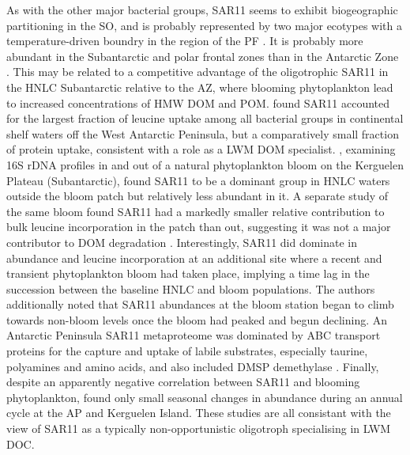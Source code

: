 As with the other major bacterial groups, SAR11 seems to exhibit biogeographic partitioning in the \ac{SO}, and is probably represented by two major ecotypes with a temperature-driven boundry in the region of the \ac{PF} \cite{Brown:2012gna}.
It is probably more abundant in the Subantarctic and polar frontal zones than in the Antarctic Zone \cite{Giebel:2009hr,Ghiglione:2011ee}.
This may be related to a competitive advantage of the oligotrophic SAR11 in the \ac{HNLC} Subantarctic relative to the \ac{AZ}, where blooming phytoplankton lead to increased concentrations of \ac{HMW} \ac{DOM} and \ac{POM}.
\citet{Straza:2010io} found SAR11 accounted for the largest fraction of leucine uptake among all bacterial groups in continental shelf waters off the West Antarctic Peninsula, but a comparatively small fraction of protein uptake, consistent with a role as a \ac{LWM} \ac{DOM} specialist.
\citet{West:2008kc}, examining 16S rDNA profiles in and out of a natural phytoplankton bloom on the Kerguelen Plateau (Subantarctic), found SAR11 to be a dominant group in \ac{HNLC} waters outside the bloom patch but relatively less abundant in it.
A separate study of the same bloom found SAR11 had a markedly smaller relative contribution to bulk leucine incorporation in the patch than out, suggesting it was not a major contributor to \ac{DOM} degradation \cite{Obernosterer:2011df}.
Interestingly, SAR11 did dominate in abundance and leucine incorporation at an additional site where a recent and transient phytoplankton bloom had taken place, implying a time lag in the succession between the baseline \ac{HNLC} and bloom populations.
The authors additionally noted that SAR11 abundances at the bloom station began to climb towards non-bloom levels once the bloom had peaked and begun declining.
An Antarctic Peninsula SAR11 metaproteome was dominated by ABC transport proteins for the capture and uptake of labile substrates, especially taurine, polyamines and amino acids, and also included \ac{DMSP} demethylase \cite{Williams:2012bs}.
Finally, despite an apparently negative correlation between SAR11 and blooming phytoplankton, \citet{Ghiglione:2011ee} found only small seasonal changes in abundance during an annual cycle at the \ac{AP} and Kerguelen Island.
These studies are all consistant with the view of SAR11 as a typically non-opportunistic oligotroph specialising in \ac{LWM} \ac{DOC}.

